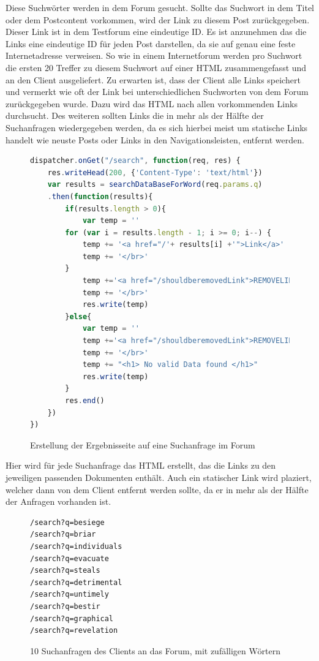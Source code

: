 Diese Suchwörter werden in dem Forum gesucht. Sollte das Suchwort in dem Titel oder dem Postcontent vorkommen, wird der Link zu diesem Post zurückgegeben. Dieser Link ist in dem Testforum eine eindeutige ID. Es ist anzunehmen das die Links eine eindeutige ID für jeden Post darstellen, da sie auf genau eine feste Internetadresse verweisen. So wie in einem Internetforum werden pro Suchwort die ersten 20 Treffer zu diesem Suchwort auf einer HTML zusammengefasst und an den Client ausgeliefert. Zu erwarten ist, dass der Client alle Links speichert und vermerkt wie oft der Link bei unterschiedlichen Suchworten von dem Forum zurückgegeben wurde. Dazu wird das HTML nach allen vorkommenden Links durchsucht. Des weiteren sollten Links die in mehr als der Hälfte der Suchanfragen wiedergegeben werden, da es sich hierbei meist um statische Links handelt wie neuste Posts oder Links in den Navigationsleisten, entfernt werden.
\newpage

\begin{figure}[h!]
\begin{lstlisting}[language=JavaScript]
dispatcher.onGet("/search", function(req, res) {
    res.writeHead(200, {'Content-Type': 'text/html'})
    var results = searchDataBaseForWord(req.params.q)
    .then(function(results){
        if(results.length > 0){
            var temp = ''
        for (var i = results.length - 1; i >= 0; i--) {
            temp += '<a href="/'+ results[i] +'">Link</a>'
            temp += '</br>'
        }
            temp +='<a href="/shouldberemovedLink">REMOVELINK</a>'
            temp += '</br>'
            res.write(temp)
        }else{
            var temp = ''
            temp +='<a href="/shouldberemovedLink">REMOVELINK</a>'
            temp += '</br>'
            temp += "<h1> No valid Data found </h1>"
            res.write(temp)
        }
        res.end()    
    })  
})
\end{lstlisting}
\caption{Erstellung der Ergebnisseite auf eine Suchanfrage im Forum}
\end{figure}

Hier wird für jede Suchanfrage das HTML erstellt, das die Links zu den jeweiligen passenden Dokumenten enthält.
Auch ein statischer Link wird plaziert, welcher dann von dem Client entfernt werden sollte, da er in mehr als der Hälfte der Anfragen vorhanden ist.

\begin{figure}[h!]
\begin{lstlisting}[language=HTML5]
/search?q=besiege
/search?q=briar
/search?q=individuals
/search?q=evacuate
/search?q=steals
/search?q=detrimental
/search?q=untimely
/search?q=bestir
/search?q=graphical
/search?q=revelation
\end{lstlisting}
\caption{10 Suchanfragen des Clients an das Forum, mit zufälligen Wörtern}
\end{figure}

